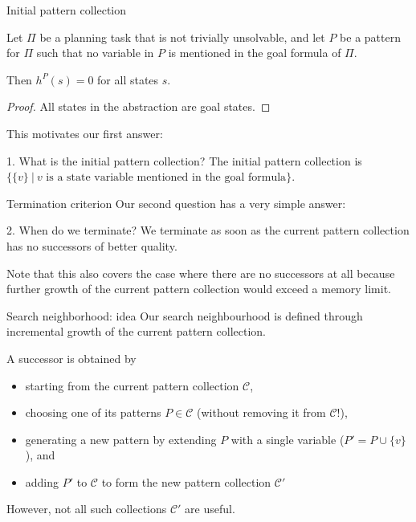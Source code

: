\documentclass{gkibeamer}
\begin{document}
\begin{frame}{Initial pattern collection}
  \begin{theorem}
    Let $\Pi$ be a {\sasplus} planning task that is not trivially
    unsolvable, and let $P$ be a pattern for $\Pi$ such that no
    variable in $P$ is mentioned in the goal formula of $\Pi$.

    Then $h^P(s) = 0$ for all states $s$.
  \end{theorem}

  \begin{proof}
    All states in the abstraction are goal states.
  \end{proof}

  \smallskip
  
  This motivates our first answer:
  \begin{block}{1. What is the initial pattern collection?}
    The initial pattern collection is
    $\{\{v\}~|~v \text{~is a state variable mentioned in the goal formula}\}$.
  \end{block}
\end{frame}

\begin{frame}{Termination criterion}
  Our second question has a very simple answer:
  \begin{block}{2. When do we terminate?}
    We terminate as soon as the current pattern collection has no
    successors of better quality.
  \end{block}

  Note that this also covers the case where there are no successors
  at all because further growth of the current pattern collection
  would exceed a memory limit.
\end{frame}

\begin{frame}{Search neighborhood: idea}
  Our search neighbourhood is defined through \alert{incremental
    growth} of the current pattern collection.

  \smallskip

  A successor is obtained by
  \begin{itemize}
  \item starting from the \alert{current pattern collection} $\mathcal
    C$,
  \item choosing \alert{one of its patterns} $P \in \mathcal C$
    (without removing it from $\mathcal C$!),
  \item generating a new pattern by extending $P$ with a single
    variable ($P' = P \cup \{v\}$), and
  \item adding $P'$ to $\mathcal C$ to form the new pattern
    collection $\mathcal C'$
  \end{itemize}

  However, not all such collections $\mathcal C'$ are useful.
\end{frame}
\end{document}
